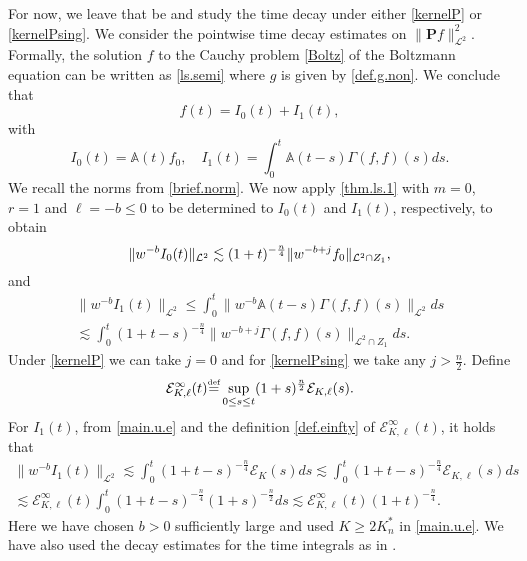 \documentclass{amsart}
\numberwithin{equation}{section}
\begin{document}
For now, we leave that be and study the time decay under either \eqref{kernelP} or \eqref{kernelPsing}.
We consider the pointwise time decay estimates on $\|{\mathbf{P}} {f}\|_{{\mathcal{L}}^2}^2$. Formally, the solution ${f}$ to the Cauchy problem \eqref{Boltz} of the Boltzmann equation can be written as \eqref{ls.semi}
where
${g}$ is given by \eqref{def.g.non}.
We conclude that
\begin{equation}  \label{Boltz.rep}
   {f}(t)=I_0(t)+I_1(t),
\end{equation}
with 
$$
  I_0(t) =  {\mathbb{A}}(t){f}_0, \quad
  I_1(t) =\int_0^t{\mathbb{A}}(t-s)\Gamma({f},{f})(s)ds.
$$
We recall the norms from \eqref{brief.norm}.  We now apply \eqref{thm.ls.1} with $m=0$, $r=1$ and ${\ell}=-{b}\le 0$ to be determined 
 to $I_0(t)$ and $I_1(t)$, respectively, to obtain
\begin{equation}  \notag
    \|w^{-{b}}I_0(t)\|_{{\mathcal{L}}^2}
    \lesssim
    (1+t)^{-\frac{n}{4}} \|w^{-{b}+{j}} {f}_0\|_{{{\mathcal{L}}^2}\cap Z_1},
\end{equation}
and
\begin{multline*}
    \|w^{-{b}} I_1(t)\|_{{\mathcal{L}}^2}\leq \int_0^t\|w^{-{b}}{\mathbb{A}}(t-s)\Gamma({f},{f})(s)\|_{{\mathcal{L}}^2}ds
    \\
\lesssim
    \int_0^t(1+t-s)^{-\frac{n}{4}}\|w^{-{b}+{j}}\Gamma({f},{f})(s)\|_{{{\mathcal{L}}^2}\cap Z_1}ds.
\end{multline*}
Under  \eqref{kernelP} we can take ${j}=0$ and for \eqref{kernelPsing} we take any ${j} > \frac{n}{2}$.  Define
\begin{equation}\label{def.einfty}
    {\mathcal{E}}_{{K},{\ell}}^\infty(t) {\overset{\mbox{\tiny{def}}}{=}} \sup_{0\leq s\leq t}(1+s)^{\frac{n}{2}}{\mathcal{E}}_{{K},{\ell}}(s).
\end{equation}
For $I_1(t)$, from \eqref{main.u.e} and the definition \eqref{def.einfty} of ${\mathcal{E}}_{{K},{\ell}}^\infty(t)$, it holds that
\begin{multline*}
    \|w^{-{b}} I_1(t)\|_{{\mathcal{L}}^2}\lesssim
    \int_0^t(1+t-s)^{-\frac{n}{4}}{\mathcal{E}}_{K}(s)ds
    \lesssim
    \int_0^t(1+t-s)^{-\frac{n}{4}}{\mathcal{E}}_{{K},{\ell}}(s)ds\\
    \lesssim {\mathcal{E}}_{{K},{\ell}}^\infty(t)\int_0^t(1+t-s)^{-\frac{n}{4}}(1+s)^{-\frac{n}{2}}ds
    \lesssim {\mathcal{E}}_{{K},{\ell}}^\infty(t)(1+t)^{-\frac{n}{4}}.
\end{multline*}
Here we have chosen ${b}>0$ sufficiently large and used ${{K \ge 2{K^*_n}}}$ in \eqref{main.u.e}.  We have also used the decay estimates for the time integrals as in \cite[Proposition 4.5]{strainSOFT}.
\end{document}

